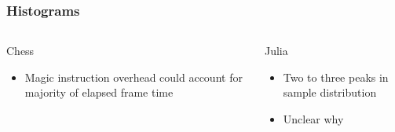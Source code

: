 \begin{frame}
\frametitle{Histograms}

\begin{center}
\resizebox{!}{0.25\textheight}{%
  
}
\end{center}

\begin{center}
\resizebox{!}{0.25\textheight}{%
  
}
\end{center}

  \begin{columns}
    \begin{block}{Chess}
      \begin{itemize}
      \item Magic instruction overhead could account for majority of elapsed frame time
      \end{itemize}
    \end{block}

    \begin{block}{Julia}
      \begin{itemize}
      \item Two to three peaks in sample distribution
      \item Unclear why
      \end{itemize}
    \end{block}
  \end{columns}

\end{frame}
